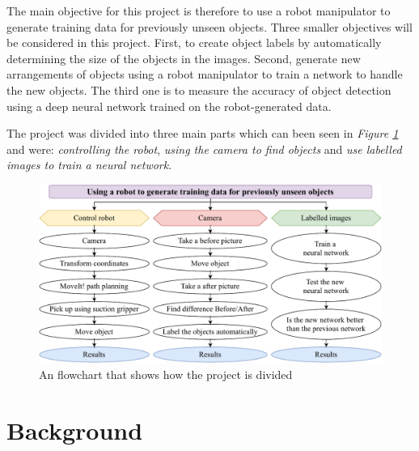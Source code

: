 The main objective for this project is therefore to use a robot manipulator to generate training data for previously unseen objects. Three smaller objectives will be considered in this project. First, to create object labels by automatically determining the size of the objects in the images. Second, generate new arrangements of objects using a robot manipulator to train a network to handle the new objects. The third one is to measure the accuracy of object detection using a deep neural network trained on the robot-generated data.

The project was divided into three main parts which can been seen in \textit{Figure \ref{fig:project}} and were: \textit{controlling the robot}, \textit{using the camera to find objects} and \textit{use labelled images to train a neural network}. 
\begin{figure}[h]
    \centering
    \includegraphics[width=1\textwidth]{graphics/meis.pdf}
    \caption{An flowchart that shows how the project is divided}
    \label{fig:project}
\end{figure}


\section{Background}


